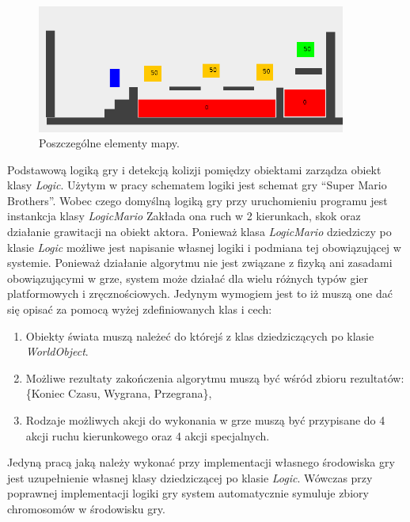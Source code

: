 \begin{par}
	\begin{figure}[!h]
		\centering
		\includegraphics[width=4in]{obrazki/objects.png}
		\caption{Poszczególne elementy mapy.}
		\label{fig:objects}
	\end{figure}
\end{par}

\begin{par}
	Podstawową logiką gry i detekcją kolizji pomiędzy obiektami zarządza obiekt klasy \textit{Logic}. Użytym w pracy schematem logiki jest schemat gry ``Super Mario Brothers''. Wobec czego domyślną logiką gry przy uruchomieniu programu jest instankcja klasy \textit{LogicMario}
	Zakłada ona ruch w 2 kierunkach, skok oraz działanie grawitacji na obiekt aktora.
	Ponieważ klasa \textit{LogicMario} dziedziczy po klasie \textit{Logic} możliwe jest napisanie własnej logiki i podmiana tej obowiązującej w systemie.
	Ponieważ działanie algorytmu nie jest związane z fizyką ani zasadami obowiązującymi w grze, system może działać dla wielu różnych typów gier platformowych i zręcznościowych.
	Jedynym wymogiem jest to iż muszą one dać się opisać za pomocą wyżej zdefiniowanych klas i cech:
	\begin{enumerate}
		\item
			Obiekty świata muszą należeć do którejś z klas dziedziczących po klasie \textit{WorldObject}.
		\item 
			Możliwe rezultaty zakończenia algorytmu muszą być wśród zbioru rezultatów: \{Koniec Czasu, Wygrana, Przegrana\}, 
		\item
			Rodzaje możliwych akcji do wykonania w grze muszą być przypisane do 4 akcji ruchu kierunkowego oraz 4 akcji specjalnych.
	\end{enumerate}

	Jedyną pracą jaką należy wykonać przy implementacji własnego środowiska gry jest uzupełnienie własnej klasy dziedziczącej po klasie \textit{Logic}.
	Wówczas przy poprawnej implementacji logiki gry system automatycznie symuluje zbiory chromosomów w środowisku gry.
\end{par}
